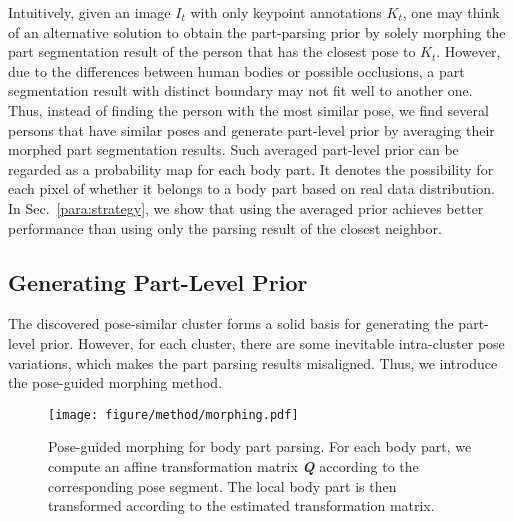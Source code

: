 \documentclass[10pt,twocolumn,letterpaper]{article}
\begin{document}
Intuitively, given an image $I_{t}$ with only keypoint annotations $K_{t}$, one may think of an alternative solution to obtain the part-parsing prior by solely morphing the part segmentation result of the person that has the closest pose to $K_{t}$. However, due to the differences between human bodies or possible occlusions, a part segmentation result with distinct boundary may not fit well to another one. Thus, instead of finding the person with the most similar pose, we find several persons that have similar poses and generate part-level prior by averaging their morphed part segmentation results. Such averaged part-level prior can be regarded as a probability map for each body part. It denotes the possibility for each pixel of whether it belongs to a body part based on real data distribution. In Sec.~\ref{para:strategy}, we show that using the averaged prior achieves better performance than using only the parsing result of the closest neighbor.


\subsection{Generating Part-Level Prior}
\label{sec:generation}
The discovered pose-similar cluster forms a solid basis for generating the part-level prior. However, for each cluster, there are some inevitable intra-cluster pose variations, which makes the part parsing results misaligned. Thus, we introduce the pose-guided morphing method.
\begin{figure}[t]
\begin{center}
\texttt{[image: figure/method/morphing.pdf]}
\end{center}
\vspace{-4mm}
   \caption{Pose-guided morphing for body part parsing. For each body part, we compute an affine transformation matrix \textbf{\emph{Q}} according to the corresponding pose segment. The local body part is then transformed according to the estimated transformation matrix.}
   \vspace{-3mm}
\label{fig:morphing}
\end{figure}
\end{document}
